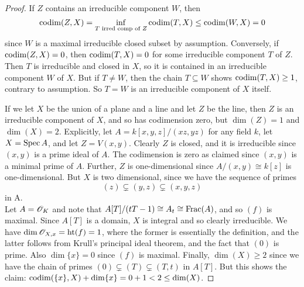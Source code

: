 \begin{proof}
	If $Z$ contains an irreducible component $W$, then
	\[ \operatorname{codim}(Z,X) = \inf_{T\text{ irred comp of }Z} \operatorname{codim}(T,X) \leq \operatorname{codim}(W,X) = 0 \]
	since $W$ is a maximal irreducible closed subset by assumption. Conversely, if $\operatorname{codim}(Z,X) = 0$, then $\operatorname{codim}(T,X) = 0$ for some irreducible component $T$ of $Z$. Then $T$ is irreducible and closed in $X$, so it is contained in an irreducible component $W$ of $X$. But if $T \neq W$, then the chain $T \subseteq W$ shows $\operatorname{codim}(T,X) \geq 1$, contrary to assumption. So $T = W$ is an irreducible component of $X$ itself.
	
	If we let $X$ be the union of a plane and a line and let $Z$ be the line, then $Z$ is an irreducible component of $X$, and so has codimension zero, but $\dim(Z) = 1$ and $\dim(X) = 2$. Explicitly, let $A = k[x,y,z]/(xz,yz)$ for any field $k$, let $X = \operatorname{Spec} A$, and let $Z = V(x,y)$. Clearly $Z$ is closed, and it is irreducible since $(x,y)$ is a prime ideal of $A$. The codimension is zero as claimed since $(x,y)$ is a minimal prime of $A$. Further, $Z$ is one-dimensional since $A/(x,y) \cong k[z]$ is one-dimensional. But $X$ is two dimensional, since we have the sequence of primes
	\[ (z) \subsetneq (y,z) \subsetneq (x,y,z) \]
	in A. \\
	
	Let $A = \mathscr{O}_K$ and note that $A[T]/(tT-1) \cong A_t \cong \operatorname{Frac}(A)$, and so $(f)$ is maximal. Since $A[T]$ is a domain, $X$ is integral and so clearly irreducible. We have $\dim \mathscr{O}_{X,x} = \operatorname{ht}(f) = 1$, where the former is essentially the definition, and the latter follows from Krull's principal ideal theorem, and the fact that $(0)$ is prime. Also $\dim\{x\} = 0$ since $(f)$ is maximal. Finally, $\dim(X) \geq 2$ since we have the chain of primes $(0) \subsetneq (T) \subsetneq (T,t)$ in $A[T]$. But this shows the claim: $\operatorname{codim}(\{x\},X)+\dim\{x\} = 0 + 1 < 2 \leq \dim(X)$.
\end{proof}
